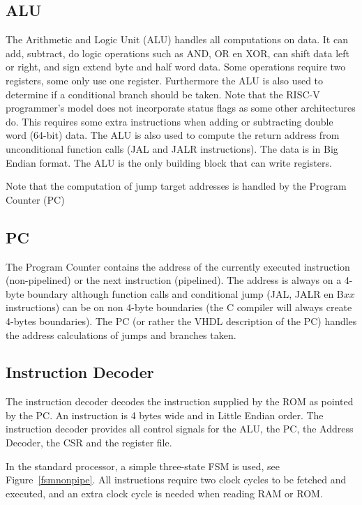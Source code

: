 \documentclass[12pt]{article}
\begin{document}
\subsection{ALU}
\label{sec:alu}
The Arithmetic and Logic Unit (ALU) handles all computations on data. It can add, subtract, do logic operations such as AND, OR en XOR, can shift data left or right, and sign extend byte and half word data. Some operations require two registers, some only use one register. Furthermore the ALU is also used to determine if a conditional branch should be taken. Note that the RISC-V programmer's model does not incorporate status flags as some other architectures do. This requires some extra instructions when adding or subtracting double word (64-bit) data. The ALU is also used to compute the return address from unconditional function calls (JAL and JALR instructions). The data is in Big Endian format. The ALU is the only building block that can write registers.

Note that the computation of jump target addresses is handled by the Program Counter (PC)

\subsection{PC}
\label{sec:pc}
The Program Counter contains the address of the currently executed instruction (non-pipelined) or the next instruction (pipelined). The address is always on a 4-byte boundary although function calls and conditional jump (JAL, JALR en B$xx$ instructions) can be on non 4-byte boundaries (the C compiler will always create 4-bytes boundaries). The PC (or rather the VHDL description of the PC) handles the address calculations of jumps and branches taken.

\subsection{Instruction Decoder}
\label{sec:instructiondecoder}
The instruction decoder decodes the instruction supplied by the ROM as pointed by the PC. An instruction is 4 bytes wide and in Little Endian order. The instruction decoder provides all control signals for the ALU, the PC, the Address Decoder, the CSR and the register file.

In the standard processor, a simple three-state FSM is used, see Figure~\ref{fsmnonpipe}. All instructions require two clock cycles to be fetched and executed, and an extra clock cycle is needed when reading RAM or ROM.
\end{document}
